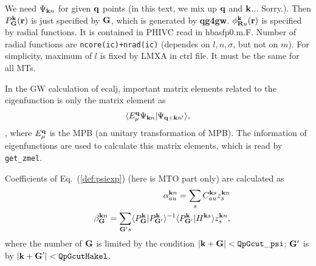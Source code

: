 \documentclass[a4paper,10pt,epsf,fleqn]{article}
\newcommand{\bfq}{{\bf q}}
\newcommand{\bfk}{{\bf k}}
\newcommand{\bfG}{{\bf G}}
\newcommand{\exe}[1]{{\bf #1}}
\newcommand{\io}[1]{{\sf  #1}}
\newcommand{\req}[1]{\mbox{Eq.~(\ref{#1})}}
\begin{document}
We need $\Psi_{{\bf k}n}$ for given $\bfq$ points 
(in this text, we mix up $\bfq$ and $\bfk$... Sorry.).
Then $P_{\bf G}^{\bf k}({\bf r})$ is just specified by 
$\bfG$, which is generated by \exe{qg4gw}.
$\phi_{{\bf R}u}^{\bf k}({\bf r})$ is specified by
radial functions. It is contained in \io{PHIVC} read in hbasfp0.m.F. Number of radial functions are
\verb#ncore(ic)+nrad(ic)# 
(dependes on $l,n,\sigma$, but not on $m$).
For simplicity, maximum of $l$ is fixed by LMXA in ctrl file.
It must be the same for all MTs.

In the GW calculation of ecalj, important matrix elements related
to the eigenfunction is only the matrix element as
\begin{eqnarray}
\langle E^{\bf q}_\mu \Psi_{{\bf k}n} |\Psi_{{\bf q+k}n'} \rangle,
\end{eqnarray}
, where $E^{\bf q}_\mu$ is the MPB (an unitary transformation of MPB).
The information of eigenfunctions are used to calculate this matrix elements, which is read by \verb#get_zmel#.



Coefficients of \req{def:psiexp} (here is MTO part only)
are calculated as
\begin{eqnarray}
&&\alpha^{{\bf k} n}_{au} = \sum_s C^{{\bf k}s}_{a u} z^{{\bf k}n}_s \\
&&\beta^{{\bf k}n}_{\bf G} = \sum_{{\bf G}'s} 
\langle P^{\bf k}_{\bf G}|P^{\bf k}_{{\bf G}'}\rangle^{-1}
\langle P^{\bf k}_{{\bf G}'}|H^{{\bf k}s}\rangle z^{{\bf k}n}_s,
\end{eqnarray}
where the number of ${\bf G}$ is limited by the condition
$|{\bf k+G}|< {\tt QpGcut\_psi}$;
${\bf G}'$ is by $|{\bf k+G}'|< {\tt  QpGcutHakel}$.
\end{document}

